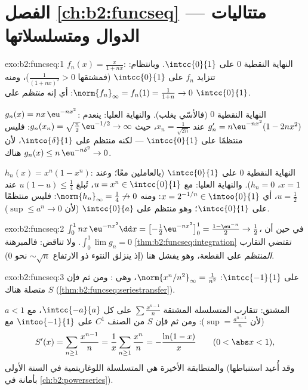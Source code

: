 \section*{الفصل \ref{ch:b2:funcseq} --- متتاليات الدوال
ومتسلسلاتها}

\begin{solution}{exo:b2:funcseq:1}
$f_n(x) = \frac{x}{1 + nx}$: النهاية النقطية $0$ على $\intcc{0}{1}$.
وبانتظام: تتزايد $f_n$ على $\intcc{0}{1}$ (فمشتقها
$\frac{1}{(1+nx)^2} > 0$)، ومنه $\norm{f_n}_\infty = f_n(1) =
\frac{1}{1+n} \to 0$: أي إنه \emph{منتظم} على $\intcc{0}{1}$.

$g_n(x) = nx\,\eu^{-nx^2}$: النهاية النقطية $0$ (فالأسّي
يغلب). والنهاية العليا: ينعدم $g_n' = n\eu^{-nx^2}(1 - 2nx^2)$ عند $x_n =
\frac{1}{\sqrt{2n}}$، حيث $g_n(x_n) = \sqrt{\frac n2}\,\eu^{-1/2}
\to \infty$: فليس منتظمًا على $\intcc{0}{1}$ --- لكنه منتظم على
$\intco{\delta}{1}$، لأن $g_n(x) \leq n\,\eu^{-n\delta^2}
\to 0$ هناك.

$h_n(x) = x^n(1 - x^n)$: النهاية النقطية $0$ على $\intcc{0}{1}$
(بالعاملين معًا؛ وعند $x = 1$، $h_n = 0$). والنهاية العليا: مع $u = x^n \in
\intcc{0}{1}$، تُبلغ $u(1-u) \leq \frac14$ عند $u = \frac12$،
أي $x = 2^{-1/n} \in \intoo{0}{1}$: ومنه $\norm{h_n}_\infty =
\frac14 \not\to 0$: فليس منتظمًا على $\intcc{0}{1}$؛ وهو منتظم على
$\intcc{0}{a}$ (لأن $\sup \leq a^n \to 0$).
\end{solution}

\begin{solution}{exo:b2:funcseq:2}
$\int_0^1 nx\,\eu^{-nx^2}\dd x = \bigl[-\tfrac12
\eu^{-nx^2}\bigr]_0^1 = \frac{1 - \eu^{-n}}{2} \to \frac12$، في حين أن
$\int_0^1 \lim g_n = 0$. ولا تناقض:
فالمبرهنة \cref{thm:b2:funcseq:integration} تقتضي التقارب
\emph{المنتظم} على القطعة، وهو يفشل هنا (إذ ينزلق النتوء ذو الارتفاع
$\sim\sqrt n$ نحو $0$).
\end{solution}

\begin{solution}{exo:b2:funcseq:3}
 على $\intcc{-1}{1}$: $\norm{x^n/n^2}_\infty =
\frac{1}{n^2}$، وهي : ومن ثم فإن $S$ متصلة هناك
(\cref{thm:b2:funcseq:seriestransfer}).

المشتق: تتقارب المتسلسلة المشتقة $\sum \frac{x^{n-1}}{n}$
 على كل $\intcc{-a}{a}$، مع $a < 1$ (لأن $\sup =
\frac{a^{n-1}}{n}$): ومن ثم فإن $S$ من الصنف $C^1$ على $\intoo{-1}{1}$ مع
\[
S'(x) = \sum_{n\geq1} \frac{x^{n-1}}{n} = \frac1x \sum_{n\geq1}
\frac{x^n}{n} = -\frac{\ln(1 - x)}{x}
\qquad (0 < \abs x < 1),
\]
والمتطابقة الأخيرة هي المتسلسلة اللوغاريتمية في السنة الأولى (وقد أُعيد
استنباطها بأمانة في \cref{ch:b2:powerseries}).
\end{solution}

